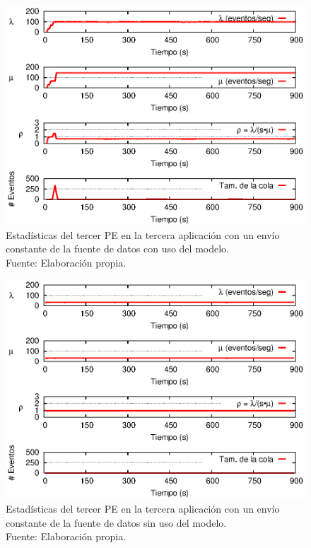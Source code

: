\begin{figure}[!htp]
    \centering
    \captionsetup{justification=centering}
    \includegraphics[scale=1]{images/exp/app3/cm/logical/statusThreePE.eps}
    \caption[Estad\'isticas del tercer PE en la tercera aplicaci\'on con un env\'io constante de la fuente de datos con uso del modelo.]{Estad\'isticas del tercer PE en la tercera aplicaci\'on con un env\'io constante de la fuente de datos con uso del modelo.\\Fuente: Elaboraci\'on propia.}
    \label{fig:app3-statusThreePE-cm}
\end{figure}

\begin{figure}[!htp]
    \centering
    \captionsetup{justification=centering}
    \includegraphics[scale=1]{images/exp/app3/sm/logical/statusThreePE.eps}
    \caption[Estad\'isticas del tercer PE en la tercera aplicaci\'on con un env\'io constante de la fuente de datos sin uso del modelo.]{Estad\'isticas del tercer PE en la tercera aplicaci\'on con un env\'io constante de la fuente de datos sin uso del modelo.\\Fuente: Elaboraci\'on propia.}
    \label{fig:app3-statusThreePE-sm}
\end{figure}